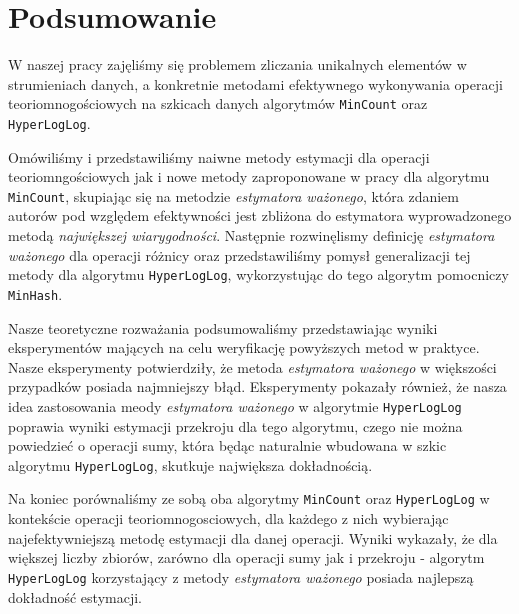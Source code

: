 \chapter{Podsumowanie}
\thispagestyle{chapterBeginStyle}

W naszej pracy zajęliśmy się problemem zliczania unikalnych elementów w strumieniach danych, a konkretnie metodami efektywnego wykonywania operacji teoriomnogościowych na szkicach danych algorytmów \texttt{MinCount} oraz \texttt{HyperLogLog}.

Omówiliśmy i przedstawiliśmy naiwne metody estymacji dla operacji teoriomngościowych jak i nowe metody zaproponowane w pracy \cite{ting} dla algorytmu \texttt{MinCount}, skupiając się na metodzie \textit{estymatora ważonego}, która zdaniem autorów pod względem efektywności jest zbliżona do estymatora wyprowadzonego metodą \textit{największej wiarygodności}. Następnie rozwinęlismy definicję \textit{estymatora ważonego} dla operacji różnicy oraz przedstawiliśmy pomysł generalizacji tej metody dla algorytmu \texttt{HyperLogLog}, wykorzystując do tego algorytm pomocniczy \texttt{MinHash}.

Nasze teoretyczne rozważania podsumowaliśmy przedstawiając wyniki eksperymentów mających na celu weryfikację powyższych metod w praktyce. Nasze eksperymenty potwierdziły, że metoda \textit{estymatora ważonego} w większości przypadków posiada najmniejszy błąd. Eksperymenty pokazały również, że nasza idea zastosowania meody \textit{estymatora ważonego} w algorytmie \texttt{HyperLogLog} poprawia wyniki estymacji przekroju dla tego algorytmu, czego nie można powiedzieć o operacji sumy, która będąc naturalnie wbudowana w szkic algorytmu \texttt{HyperLogLog}, skutkuje największa dokładnością.

Na koniec porównaliśmy ze sobą oba algorytmy \texttt{MinCount} oraz \texttt{HyperLogLog} w kontekście operacji teoriomnogosciowych, dla każdego z nich wybierając najefektywniejszą metodę estymacji dla danej operacji. Wyniki wykazały, że dla większej liczby zbiorów, zarówno dla operacji sumy jak i przekroju - algorytm \texttt{HyperLogLog} korzystający z metody \textit{estymatora ważonego} posiada najlepszą dokładność estymacji.



